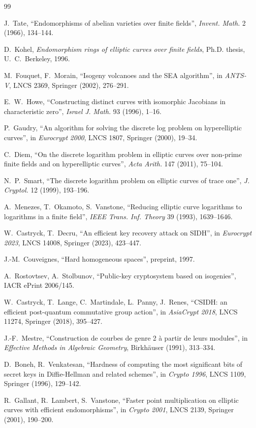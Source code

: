 \documentclass[11pt,a4paper]{article}
\theoremstyle{definition}
\begin{document}
\begin{thebibliography}{99}

 J.~Tate, ``Endomorphisms of abelian varieties
over finite fields'', \emph{Invent. Math.} 2 (1966), 134--144.

 D.~Kohel, \emph{Endomorphism rings of elliptic
curves over finite fields}, Ph.D. thesis, U.~C.~Berkeley, 1996.

 M.~Fouquet, F.~Morain, ``Isogeny
volcanoes and the SEA algorithm'', in \emph{ANTS-V}, LNCS 2369,
Springer (2002), 276--291.

 E.~W.~Howe, ``Constructing distinct curves with
isomorphic Jacobians in characteristic zero'', \emph{Israel J. Math.}
93 (1996), 1--16.

 P.~Gaudry, ``An algorithm for solving the
discrete log problem on hyperelliptic curves'', in \emph{Eurocrypt
2000}, LNCS 1807, Springer (2000), 19--34.

 C.~Diem, ``On the discrete logarithm problem in
elliptic curves over non-prime finite fields and on hyperelliptic
curves'', \emph{Acta Arith.} 147 (2011), 75--104.

 N.~P.~Smart, ``The discrete logarithm problem
on elliptic curves of trace one'', \emph{J. Cryptol.} 12 (1999),
193--196.

 A.~Menezes, T.~Okamoto, S.~Vanstone, ``Reducing
elliptic curve logarithms to logarithms in a finite field'',
\emph{IEEE Trans. Inf. Theory} 39 (1993), 1639--1646.

 W.~Castryck, T.~Decru, ``An efficient
key recovery attack on SIDH'', in \emph{Eurocrypt 2023}, LNCS
14008, Springer (2023), 423--447.

 J.-M.~Couveignes, ``Hard homogeneous
spaces'', preprint, 1997.

 A.~Rostovtsev, A.~Stolbunov,
``Public-key cryptosystem based on isogenies'', IACR ePrint
2006/145.

 W.~Castryck, T.~Lange, C.~Martindale, L.~Panny,
J.~Renes, ``CSIDH: an efficient post-quantum commutative group
action'', in \emph{AsiaCrypt 2018}, LNCS 11274, Springer (2018),
395--427.

 J.-F.~Mestre, ``Construction de courbes de
genre 2 à partir de leurs modules'', in \emph{Effective Methods in
Algebraic Geometry}, Birkhäuser (1991), 313--334.

 D.~Boneh, R.~Venkatesan, ``Hardness of computing
the most significant bits of secret keys in Diffie-Hellman and
related schemes'', in \emph{Crypto 1996}, LNCS 1109, Springer
(1996), 129--142.

 R.~Gallant, R.~Lambert, S.~Vanstone, ``Faster
point multiplication on elliptic curves with efficient
endomorphisms'', in \emph{Crypto 2001}, LNCS 2139, Springer (2001),
190--200.

\end{thebibliography}
\end{document}
